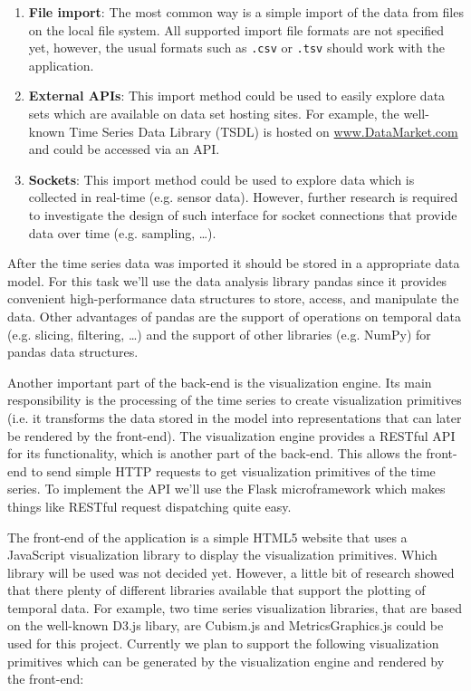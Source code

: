 \documentclass[12pt, a4paper]{article}
\begin{document}
\begin{enumerate}
 \item \textbf{File import}: The most common way is a simple import of the data from files on the local file system.
 All supported import file formats are not specified yet, however, the usual formats such as \texttt{.csv} or \texttt{.tsv} should work with the application.
 \item \textbf{External APIs}: This import method could be used to easily explore data sets which are available on data set hosting sites. 
 For example, the well-known Time Series Data Library (TSDL) is hosted on \url{www.DataMarket.com} and could be accessed via an API. 
 \item \textbf{Sockets}: This import method could be used to explore data which is collected in real-time (e.g. sensor data). 
 However, further research is required to investigate the design of such interface for socket connections that provide data over time (e.g. sampling, \ldots).
\end{enumerate}

After the time series data was imported it should be stored in a appropriate data model. 
For this task we'll use the data analysis library pandas since it provides convenient high-performance data structures to store, access, and manipulate the data.
Other advantages of pandas are the support of operations on temporal data (e.g. slicing, filtering, \ldots) and the support of other libraries (e.g. NumPy) for pandas data structures.

Another important part of the back-end is the visualization engine. 
Its main responsibility is the processing of the time series to create visualization primitives (i.e. it transforms the data stored in the model into representations that can later be rendered by the front-end).
The visualization engine provides a RESTful API for its functionality, which is another part of the back-end.
This allows the front-end to send simple HTTP requests to get visualization primitives of the time series.
To implement the API we'll use the Flask microframework which makes things like RESTful request dispatching quite easy.

The front-end of the application is a simple HTML5 website that uses a JavaScript visualization library to display the visualization primitives.
Which library will be used was not decided yet.
However, a little bit of research showed that there plenty of different libraries available that support the plotting of temporal data.
For example, two time series visualization libraries, that are based on the well-known D3.js libary, are Cubism.js and MetricsGraphics.js could be used for this project.
Currently we plan to support the following visualization primitives which can be generated by the visualization engine and rendered by the front-end:
\end{document}
